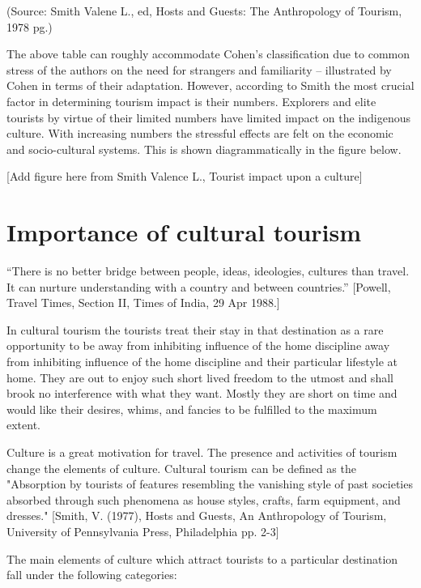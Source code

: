 (Source: Smith Valene L., ed, Hosts and Guests: The Anthropology of Tourism, 1978 pg.)

The above table can roughly accommodate Cohen's classification due to common stress of the authors on the need for strangers and familiarity -- illustrated by Cohen in terms of their adaptation. However, according to Smith the most crucial factor in determining tourism impact is their numbers. Explorers and elite tourists by virtue of their limited numbers have limited impact on the indigenous culture. With increasing numbers the stressful effects are felt on the economic and socio-cultural systems. This is shown diagrammatically in the figure below.

[Add figure here from Smith Valence L., Tourist impact upon a culture]



\section{Importance of cultural tourism} %
\label{sec:imct}

``There is no better bridge between people, ideas, ideologies, cultures than travel. It can nurture understanding with a country and between countries.'' [Powell, Travel Times, Section II, Times of India, 29 Apr 1988.]

In cultural tourism the tourists treat their stay in that destination as a rare opportunity to be away from inhibiting influence of the home discipline away from inhibiting influence of the home discipline and their particular lifestyle at home. They are out to enjoy such short lived freedom to the utmost and shall brook no interference with what they want. Mostly they are short on time and would like their desires, whims, and fancies to be fulfilled to the maximum extent.

Culture is a great motivation for travel. The presence and activities of tourism change the elements of culture. Cultural tourism can be defined as the "Absorption by tourists of features resembling the vanishing style of past societies absorbed through such phenomena as house styles, crafts, farm equipment, and dresses." [Smith, V. (1977), Hosts and Guests, An Anthropology of Tourism, University of Pennsylvania Press, Philadelphia pp. 2-3]

The main elements of culture which attract tourists to a particular destination fall under the following categories:

